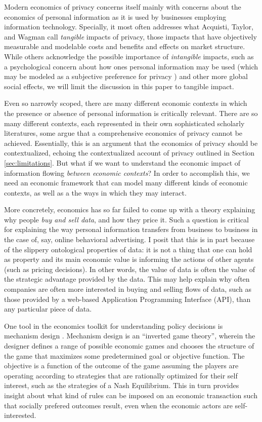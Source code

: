 \documentclass[../thesis.tex]{subfiles}
\begin{document}
Modern economics of privacy concerns itself mainly with
concerns about the economics of personal information
as it is used by businesses employing
information technology.
Specially, it most often addresses what Acquisti,
 Taylor, and Wagman \cite{acquisti2016economics} 
call \emph{tangible} impacts of privacy, those impacts that
have objectively measurable and modelable costs and
benefits and effects on market structure.
While others acknowledge the possible importance
of \emph{intangible} impacts, such as a psychological
concern about how ones personal information may be
used (which may be modeled as a subjective preference
for privacy \cite{calo2011boundaries} 
\cite{cofone2017dynamic}) and other more global
social effects, we will limit the discussion in this
paper to tangible impact.

Even so narrowly scoped, there are many different
economic contexts in which the presence or absence 
of personal information is critically relevant. 
There are so many different contexts, each represented
in their own sophisticated scholarly literatures,
some \cite{acquisti2016economics} argue that a comprehensive
economics of privacy cannot be achieved.
Essentially, this is an argument that the economics
of privacy should be contextualized, echoing
the contextualized account of privacy outlined
in Section \ref{sec:limitations}.
But what if we want to understand the economic impact of
information flowing \emph{between economic contexts}?
In order to accomplish this, we need an economic framework
that can model many different kinds of economic contexts,
as well as a the ways in which they may interact.

More concretely, economics has so far failed to come up
with a theory explaining why people \emph{buy and sell data},
and how they price it.
Such a question is critical for explaining the way personal
information transfers from business to business in the case
of, say, online behavioral advertising.
I posit that this is in part because of the slippery
ontological properties of data: it is not a thing that
one can hold as property and its main economic value is
informing the actions of other agents (such as pricing
decisions).
In other words, the value of data is often the value
of the strategic advantage provided by the data.
This may help explain why often companies are often
more interested in buying and selling
flows of data, such as those provided by a web-based
Application Programming Interface (API), than any particular
piece of data.

One tool in the economics toolkit for understanding
policy decisions is mechanism design \cite{hurwicz2006designing}
\cite{nisan2007introduction}. 
Mechanism design is an ``inverted game theory'',
wherein the designer defines a range of possible
economic games and chooses the structure of the game
that maximizes some predetermined goal or objective
function.
The objective is a function of the outcome of the
game assuming the players are operating according
to strategies that are rationally optimized for their
self interest, such as the strategies of a Nash Equilibrium.
This in turn provides insight about what kind of rules
can be imposed on an economic transaction such that socially
prefered outcomes result, even when the economic actors
are self-interested.
\end{document}
